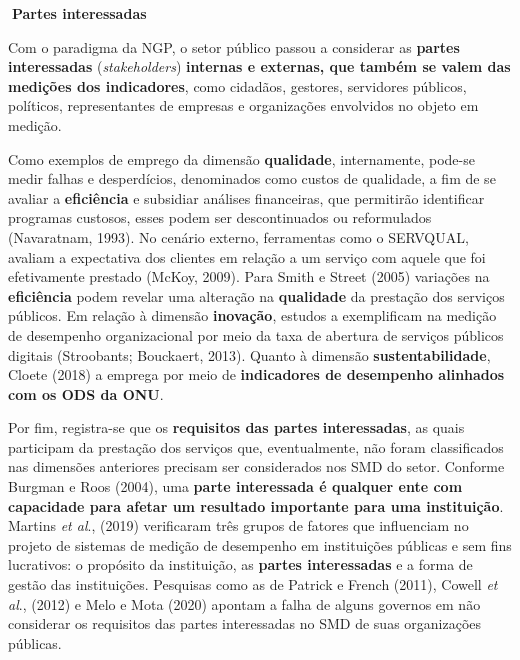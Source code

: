 \documentclass[
  letterpaper,
  DIV=11,
  numbers=noendperiod]{scrreprt}
\begin{document}
\begin{tcolorbox}[enhanced jigsaw, bottomrule=.15mm, arc=.35mm, breakable, toprule=.15mm, rightrule=.15mm, opacityback=0, left=2mm, colback=white, leftrule=.75mm]

\textbf{🔽{Partes interessadas}}\vspace{2mm}

Com o paradigma da NGP, o setor público passou a considerar as
\textbf{partes interessadas} (\emph{stakeholders}) \textbf{internas e
externas, que também se valem das medições dos indicadores}, como
cidadãos, gestores, servidores públicos, políticos, representantes de
empresas e organizações envolvidos no objeto em medição.

\end{tcolorbox}

Como exemplos de emprego da dimensão \textbf{qualidade}, internamente,
pode-se medir falhas e desperdícios, denominados como custos de
qualidade, a fim de se avaliar a \textbf{eficiência} e subsidiar
análises financeiras, que permitirão identificar programas custosos,
esses podem ser descontinuados ou reformulados (Navaratnam, 1993). No
cenário externo, ferramentas como o SERVQUAL, avaliam a expectativa dos
clientes em relação a um serviço com aquele que foi efetivamente
prestado (McKoy, 2009). Para Smith e Street (2005) variações na
\textbf{eficiência} podem revelar uma alteração na \textbf{qualidade} da
prestação dos serviços públicos. Em relação à dimensão
\textbf{inovação}, estudos a exemplificam na medição de desempenho
organizacional por meio da taxa de abertura de serviços públicos
digitais (Stroobants; Bouckaert, 2013). Quanto à dimensão
\textbf{sustentabilidade}, Cloete (2018) a emprega por meio de
\textbf{indicadores de desempenho alinhados com os ODS da ONU}.

Por fim, registra-se que os \textbf{requisitos das partes interessadas},
as quais participam da prestação dos serviços que, eventualmente, não
foram classificados nas dimensões anteriores precisam ser considerados
nos SMD do setor. Conforme Burgman e Roos (2004), uma \textbf{parte
interessada é qualquer ente com capacidade para afetar um resultado
importante para uma instituição}. Martins \emph{et al}., (2019)
verificaram três grupos de fatores que influenciam no projeto de
sistemas de medição de desempenho em instituições públicas e sem fins
lucrativos: o propósito da instituição, as \textbf{partes interessadas}
e a forma de gestão das instituições. Pesquisas como as de Patrick e
French (2011), Cowell \emph{et al}., (2012) e Melo e Mota (2020) apontam
a falha de alguns governos em não considerar os requisitos das partes
interessadas no SMD de suas organizações públicas.
\end{document}
